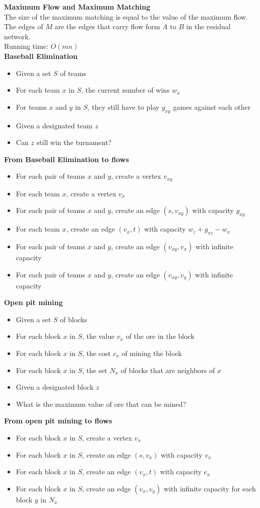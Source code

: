 \documentclass[onecolumn]{report}
\begin{document}
\noindent
\textbf{Maximum Flow and Maximum Matching}\\
The size of the maximum matching is equal to the value of the maximum flow.\\
The edges of $M$ are the edges that carry flow form $A$ to $B$ in the residual network.\\
Running time: $O(mn)$\\
\textbf{Baseball Elimination}
\begin{itemize}
    \item Given a set $S$ of teams
    \item For each team $x$ in $S$, the current number of wins $w_x$
    \item For teams $x$ and $y$ in $S$, they still have to play $g_{xy}$ games against each other
    \item Given a designated team $z$
    \item Can $z$ still win the turnament?
\end{itemize}
\textbf{From Baseball Elimination to flows}
\begin{itemize}
    \item For each pair of teams $x$ and $y$, create a vertex $v_{xy}$
    \item For each team $x$, create a vertex $v_x$
    \item For each pair of teams $x$ and $y$, create an edge $(s, v_{xy})$ with capacity $g_{xy}$
    \item For each team $x$, create an edge $(v_x, t)$ with capacity $w_z + g_{xz} - w_x$
    \item For each pair of teams $x$ and $y$, create an edge $(v_{xy}, v_x)$ with infinite capacity
    \item For each pair of teams $x$ and $y$, create an edge $(v_{xy}, v_y)$ with infinite capacity
\end{itemize}
\noindent
\textbf{Open pit mining}
\begin{itemize}
    \item Given a set $S$ of blocks
    \item For each block $x$ in $S$, the value $v_x$ of the ore in the block
    \item For each block $x$ in $S$, the cost $c_x$ of mining the block
    \item For each block $x$ in $S$, the set $N_x$ of blocks that are neighbors of $x$
    \item Given a designated block $z$
    \item What is the maximum value of ore that can be mined?
\end{itemize}
\textbf{From open pit mining to flows}
\begin{itemize}
    \item For each block $x$ in $S$, create a vertex $v_x$
    \item For each block $x$ in $S$, create an edge $(s, v_x)$ with capacity $v_x$
    \item For each block $x$ in $S$, create an edge $(v_x, t)$ with capacity $c_x$
    \item For each block $x$ in $S$, create an edge $(v_x, v_y)$ with infinite capacity for each block $y$ in $N_x$
\end{itemize}
\end{document}
